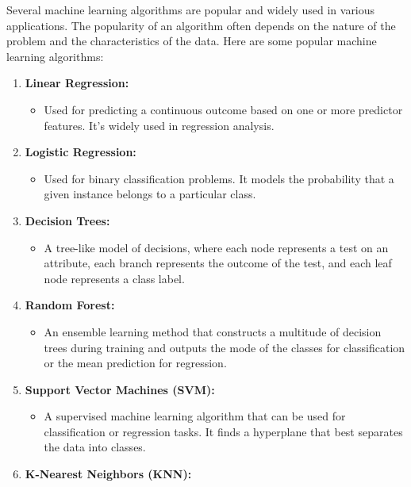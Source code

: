 \documentclass[
]{book}
\providecommand{\tightlist}{%
  \setlength{\itemsep}{0pt}\setlength{\parskip}{0pt}}
\begin{document}
Several machine learning algorithms are popular and widely used in various applications. The popularity of an algorithm often depends on the nature of the problem and the characteristics of the data. Here are some popular machine learning algorithms:

\begin{enumerate}
\def\labelenumi{\arabic{enumi}.}
\tightlist
\item
  \textbf{Linear Regression:}

  \begin{itemize}
  \tightlist
  \item
    Used for predicting a continuous outcome based on one or more predictor features. It's widely used in regression analysis.
  \end{itemize}
\item
  \textbf{Logistic Regression:}

  \begin{itemize}
  \tightlist
  \item
    Used for binary classification problems. It models the probability that a given instance belongs to a particular class.
  \end{itemize}
\item
  \textbf{Decision Trees:}

  \begin{itemize}
  \tightlist
  \item
    A tree-like model of decisions, where each node represents a test on an attribute, each branch represents the outcome of the test, and each leaf node represents a class label.
  \end{itemize}
\item
  \textbf{Random Forest:}

  \begin{itemize}
  \tightlist
  \item
    An ensemble learning method that constructs a multitude of decision trees during training and outputs the mode of the classes for classification or the mean prediction for regression.
  \end{itemize}
\item
  \textbf{Support Vector Machines (SVM):}

  \begin{itemize}
  \tightlist
  \item
    A supervised machine learning algorithm that can be used for classification or regression tasks. It finds a hyperplane that best separates the data into classes.
  \end{itemize}
\item
  \textbf{K-Nearest Neighbors (KNN):}


\end{enumerate}
\end{document}
